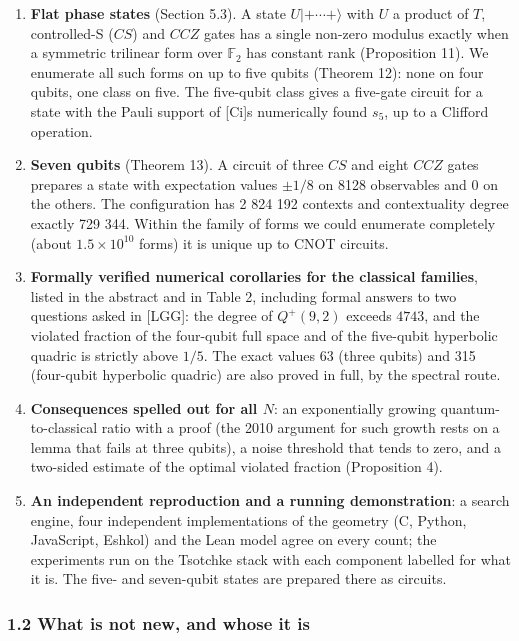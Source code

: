 \documentclass[11pt,a4paper]{article}
\begin{document}
\begin{enumerate}
\item
  \textbf{Flat phase states} (Section 5.3). A state \(U|{+}\cdots{+}\rangle\) with \(U\) a product of \(T\),
  controlled-S (\(CS\)) and \(CCZ\) gates has a single non-zero modulus exactly when a symmetric trilinear form
  over \(\mathbb{F}_2\) has constant rank (Proposition 11). We enumerate all such forms on up to five
  qubits (Theorem 12): none on four qubits, one class on five. The five-qubit class gives a
  five-gate circuit for a state with the Pauli support of {[}Ci{]}\textquotesingle s numerically found \(s_5\), up to a
  Clifford operation.
\item
  \textbf{Seven qubits} (Theorem 13). A circuit of three \(CS\) and eight \(CCZ\) gates prepares a state
  with expectation values \(\pm 1/8\) on 8128 observables and \(0\) on the others. The configuration has
  2 824 192 contexts and contextuality degree exactly 729 344. Within the family of forms we could
  enumerate completely (about \(1.5 \times 10^{10}\) forms) it is unique up to CNOT circuits.
\item
  \textbf{Formally verified numerical corollaries for the classical families}, listed in the abstract and in
  Table 2, including formal answers to two questions asked in {[}LGG{]}: the degree of \(Q^+(9,2)\) exceeds
  \(4743\), and the violated fraction of the four-qubit full space and of the five-qubit hyperbolic
  quadric is strictly above \(1/5\). The exact values 63 (three qubits) and 315 (four-qubit hyperbolic
  quadric) are also proved in full, by the spectral route.
\item
  \textbf{Consequences spelled out for all \(N\)}: an exponentially growing quantum-to-classical ratio with
  a proof (the 2010 argument for such growth rests on a lemma that fails at three qubits), a noise
  threshold that tends to zero, and a two-sided estimate of the optimal violated fraction (Proposition 4).
\item
  \textbf{An independent reproduction and a running demonstration}: a search engine, four independent
  implementations of the geometry (C, Python, JavaScript, Eshkol) and the Lean model agree on every
  count; the experiments run on the Tsotchke stack with each component labelled for what it is. The
  five- and seven-qubit states are prepared there as circuits.
\end{enumerate}

\subsubsection{1.2 What is not new, and whose it is}\label{12-what-is-not-new-and-whose-it-is}
\end{document}
